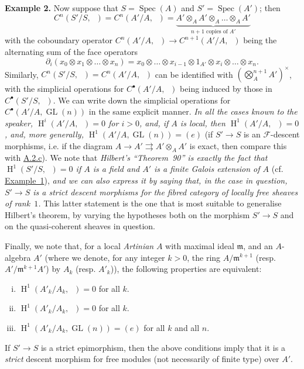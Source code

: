 \documentclass{article}
\newenvironment{rmenv}[1]
  {\phantomsection\par\medskip\noindent\textbf{#1.}\rmfamily}
  {\par\medskip}
\renewcommand{\cal}[1]{{\mathcal{#1}}}
\newcommand{\fk}[1]{{\mathfrak{#1}}}
\DeclareMathOperator{\HH}{H}
\DeclareMathOperator{\GL}{GL}
\DeclareMathOperator{\Ga}{G_a}
\DeclareMathOperator{\Gm}{G_m}
\DeclareMathOperator{\Spec}{Spec}
\newcommand{\oldpage}[1]{\marginpar{\footnotesize$\Big\vert$ \textit{p.~#1}}}
\begin{document}
\begin{rmenv}{Example 2}
  Now suppose that $S=\Spec(A)$ and $S'=\Spec(A')$;
  then
  \[
    C^n(S'/S,\Ga)
    = C^n(A'/A,\Ga)
    = \underbrace{A'\otimes_A A'\otimes_A\ldots\otimes_A A'}_{\mbox{$n+1$ copies of $A'$}}
  \]
  with the coboundary operator $C^n(A'/A,\Ga)\to C^{n+1}(A'/A,\Ga)$ being the alternating sum of the face operators
  \[
    \partial_i(x_0\otimes x_1\otimes\ldots\otimes x_n)
    = x_0\otimes\ldots\otimes x_{i-1}\otimes1_{A'}\otimes x_i\otimes\ldots\otimes x_n.
  \]
  Similarly, $C^n(S'/S,\Gm)=C^n(A'/A,\Gm)$ can be identified with $(\bigotimes_A^{n+1}A')^\times$, with the simplicial operations for $C^\bullet(A'/A,\Gm)$ being induced by those in $C^\bullet(S'/S,\Ga)$.
  We can write down the simplicial operations for $C^\bullet(A'/A,\GL(n))$ in the same explicit manner.
  \emph{In all the cases known to the speaker, $\HH^i(A'/A,\Ga)=0$ for $i>0$, and, if $A$ is local, then $\HH^1(A'/A,\Gm)=0$, and, more generally, $\HH^1(A'/A,\GL(n))=(e)$} (if $S'\to S$ is an $\cal{F}$-descent morphisms, i.e. if the diagram $A\to A'\rightrightarrows A'\otimes_A A'$ is exact, then compare this with \hyperref[A.2.c]{A.2.c}).
  We note that \emph{Hilbert's ``Theorem~90'' is exactly the fact that}
\oldpage{190-16}
  \emph{$\HH^1(S'/S,\Gm)=0$ if $A$ is a field and $A'$ is a finite Galois extension of $A$} (cf. \hyperref[example:A.4.d]{Example~1}), \emph{and we can also express it by saying that, in the case in question, $S'\to S$ is a strict descent morphisms for the fibred category of locally free sheaves of rank~$1$.}
  This latter statement is the one that is most suitable to generalise Hilbert's theorem, by varying the hypotheses both on the morphism $S'\to S$ and on the quasi-coherent sheaves in question.

  Finally, we note that, for a local \emph{Artinian} $A$ with maximal ideal $\fk{m}$, and an $A$-algebra $A'$ (where we denote, for any integer $k>0$, the ring $A/\fk{m}^{k+1}$ (resp. $A'/\fk{m}^{k+1}A'$) by $A_k$ (resp. $A'_k$)), the following properties are equivalent:
  \begin{enumerate}[(i)]
    \item $\HH^1(A'_k/A_k,\Ga)=0$ for all $k$.
    \item $\HH^1(A'_k/A_k,\Gm)=0$ for all $k$.
    \item $\HH^1(A'_k/A_k,\GL(n))=(e)$ for all $k$ and all $n$.
  \end{enumerate}

  If $S'\to S$ is a strict epimorphism, then the above conditions imply that it is a \emph{strict} descent morphism for free modules (not necessarily of finite type) over $A'$.
\end{rmenv}
\end{document}
